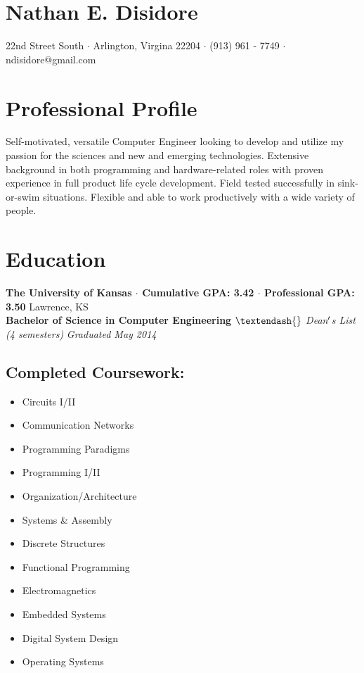 \documentclass[10pt]{article}
\newcommand{\startsquarepar}{\par\begingroup \parfillskip 0pt \relax}
\newcommand{\stopsquarepar}{\par\endgroup}
\newenvironment{ninept}{\fontsize{9}{12}\selectfont}{\par}
\begin{document}
\pagestyle{empty} %

\section*{\Huge Nathan E. Disidore}
\startsquarepar
  3429 22nd Street South $\cdot$ Arlington, Virgina 22204 $\cdot$ (913) 961 - 7749 $\cdot$ ndisidore@gmail.com
\stopsquarepar

\section*{Professional Profile}
Self-motivated, versatile Computer Engineer looking to develop and utilize my passion for the sciences and new and emerging technologies. Extensive background in both programming and hardware-related roles with proven experience in full product life cycle development. Field tested successfully in sink-or-swim situations. Flexible and able to work productively with a wide variety of people.

\section*{Education}
\textbf{The University of Kansas $\cdot$ Cumulative GPA: 3.42 $\cdot$ Professional GPA: 3.50}
\hfill
Lawrence, KS \\
\textbf{Bachelor of Science in Computer Engineering}
\textit{$\textendash{}$ Dean$\rq$s List (4 semesters)}
\hfill
\textit{Graduated May 2014}
\subsection*{Completed Coursework:}
\begin{ninept}
  \begin{multicols}{4}
    \begin{itemize}
      \item Circuits I/II
      \item Communication Networks
      \item Programming Paradigms
      \item Programming I/II
      \item Organization/Architecture
      \item Systems \& Assembly
      \item Discrete Structures
      \item Functional Programming
      \item Electromagnetics
      \item Embedded Systems
      \item Digital System Design
      \item Operating Systems
    \end{itemize}
  \end{multicols}
\end{ninept}
\end{document}
